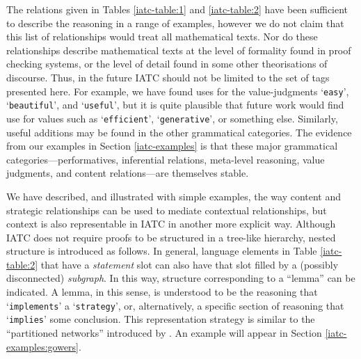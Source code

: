 \documentclass[smallextended,oneside]{svjour3}       %
\newcommand\nothing[1]{#1}
\let\paragraph\nothing
\begin{document}
\paragraph{The relations given in Tables \ref{iatc-table:1} and \ref{iatc-table:2} have been sufficient to describe the reasoning in a range of examples, however we do not claim that this list of relationships would treat all mathematical texts.}
Nor do these relationships describe mathematical texts at the
level of formality found in proof checking systems, or the level of
detail found in some other theorisations of discourse.
Thus, in the future IATC should not be limited to the set of tags presented here.
For example, we have found uses for the value-judgments
`\texttt{easy}', `\texttt{beautiful}', and `\texttt{useful}', but it is
quite plausible that future work would find use for values such as
`\texttt{efficient}', `\texttt{generative}', or something else.
Similarly, useful additions may be found in the other grammatical categories.
The evidence from our examples in Section \ref{iatc-examples} is that
these major grammatical categories---performatives, inferential
relations, meta-level reasoning, value judgments, and content
relations---are themselves stable.

\paragraph{We have described, and illustrated with simple examples, the way content and strategic relationships can be used to mediate contextual relationships, but context is also representable in IATC in another more explicit way.}
Although IATC does not require proofs to be structured in a tree-like
hierarchy, nested structure is introduced as follows. 
In general, language elements in Table \ref{iatc-table:2}
that have a \emph{statement} slot can also have that slot filled by a
(possibly disconnected) \emph{subgraph}.  In this way, structure
corresponding to a ``lemma'' can be indicated.
A lemma, in this sense, is understood to be the reasoning that `\texttt{implements}' a
`\texttt{strategy}', or, alternatively, a specific section of reasoning
that `\texttt{implies}' some conclusion.   This representation strategy is similar to the ``partitioned
networks'' introduced by \citet{hendrix1975partitioned,hendrix1979encoding}.
An example will appear in Section \ref{iatc-examples:gowers}.
\end{document}
